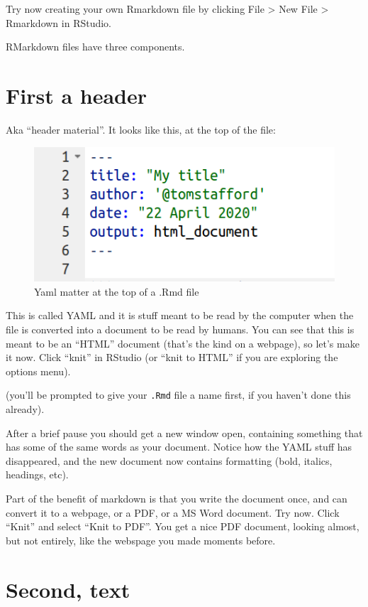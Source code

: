 \documentclass[
  12pt,
  a5paper,
]{book}
\begin{document}
Try now creating your own Rmarkdown file by clicking File \textgreater{} New File \textgreater{} Rmarkdown in RStudio.

RMarkdown files have three components.

\hypertarget{first-a-header}{%
\section{First a header}\label{first-a-header}}

Aka ``header material''. It looks like this, at the top of the file:

\begin{figure}
\centering
\includegraphics{images/yaml.png}
\caption{Yaml matter at the top of a .Rmd file}
\end{figure}

This is called YAML and it is stuff meant to be read by the computer when the file is converted into a document to be read by humans. You can see that this is meant to be an ``HTML'' document (that's the kind on a webpage), so let's make it now. Click ``knit'' in RStudio (or ``knit to HTML'' if you are exploring the options menu).

(you'll be prompted to give your \texttt{.Rmd} file a name first, if you haven't done this already).

After a brief pause you should get a new window open, containing something that has some of the same words as your document. Notice how the YAML stuff has disappeared, and the new document now contains formatting (bold, italics, headings, etc).

Part of the benefit of markdown is that you write the document once, and can convert it to a webpage, or a PDF, or a MS Word document. Try now. Click ``Knit'' and select ``Knit to PDF''. You get a nice PDF document, looking almost, but not entirely, like the webspage you made moments before.

\hypertarget{second-text}{%
\section{Second, text}\label{second-text}}
\end{document}
